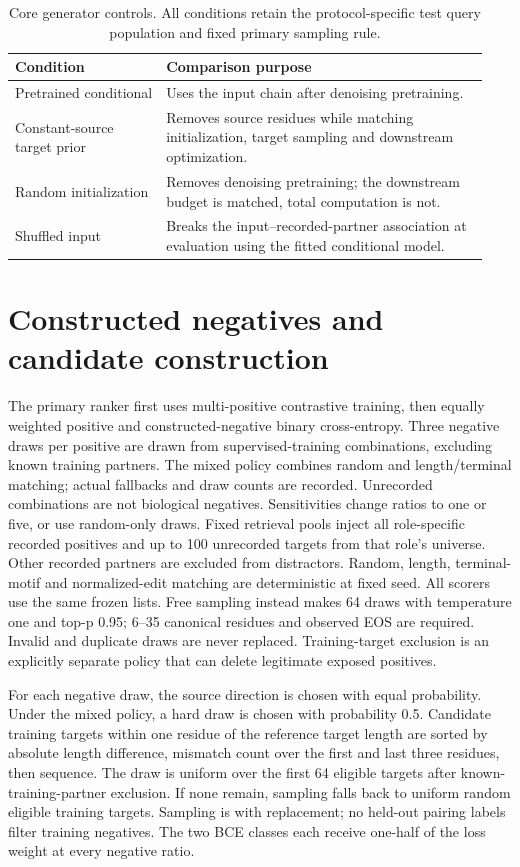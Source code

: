 \documentclass[11pt]{article}
\begin{document}
\begin{table}[htbp]
\centering
\caption{Core generator controls. All conditions retain the protocol-specific test query population and fixed primary sampling rule.}
\begin{tabular}{p{0.30\linewidth}p{0.64\linewidth}}
\toprule
Condition & Comparison purpose\\
\midrule
Pretrained conditional & Uses the input chain after denoising pretraining.\\
Constant-source target prior & Removes source residues while matching initialization, target sampling and downstream optimization.\\
Random initialization & Removes denoising pretraining; the downstream budget is matched, total computation is not.\\
Shuffled input & Breaks the input--recorded-partner association at evaluation using the fitted conditional model.\\
\bottomrule
\end{tabular}
\end{table}

\section{Constructed negatives and candidate construction}
The primary ranker first uses multi-positive contrastive training, then equally
weighted positive and constructed-negative binary cross-entropy. Three negative
draws per positive are drawn from supervised-training combinations, excluding
known training partners. The mixed policy combines random and length/terminal
matching; actual fallbacks and draw counts are recorded. Unrecorded combinations
are not biological negatives. Sensitivities change ratios to one or five, or
use random-only draws. Fixed retrieval pools inject all role-specific recorded
positives and up to 100 unrecorded targets from that role's universe. Other
recorded partners are excluded from distractors. Random, length, terminal-motif
and normalized-edit matching are deterministic at fixed seed. All scorers use
the same frozen lists. Free sampling instead makes 64 draws with temperature
one and top-p 0.95; 6--35 canonical residues and observed EOS are required.
Invalid and duplicate draws are never replaced. Training-target exclusion is
an explicitly separate policy that can delete legitimate exposed positives.

For each negative draw, the source direction is chosen with equal probability.
Under the mixed policy, a hard draw is chosen with probability 0.5. Candidate
training targets within one residue of the reference target length are sorted
by absolute length difference, mismatch count over the first and last three
residues, then sequence. The draw is uniform over the first 64 eligible targets
after known-training-partner exclusion. If none remain, sampling falls back to
uniform random eligible training targets. Sampling is with replacement;
no held-out pairing labels filter training negatives. The two BCE classes each
receive one-half of the loss weight at every negative ratio.
\end{document}
